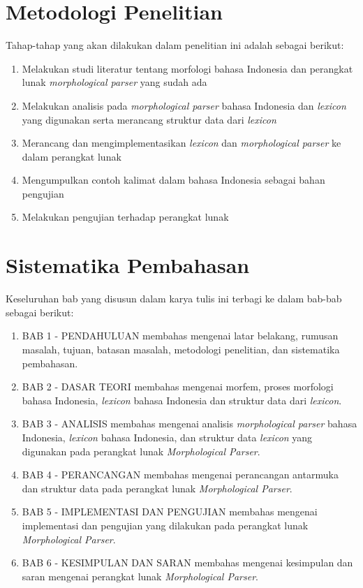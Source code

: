 \section{Metodologi Penelitian}
\label{sec:metodologiPenelitian}

Tahap-tahap yang akan dilakukan dalam penelitian ini adalah sebagai berikut:
\begin{enumerate}
	\item Melakukan studi literatur tentang morfologi bahasa Indonesia dan perangkat lunak {\it morphological parser} yang sudah ada
	\item Melakukan analisis pada {\it morphological parser} bahasa Indonesia dan {\it lexicon} yang digunakan serta merancang struktur data dari {\it lexicon}
	\item Merancang dan mengimplementasikan {\it lexicon} dan {\it morphological parser} ke dalam perangkat lunak
	\item Mengumpulkan contoh kalimat dalam bahasa Indonesia sebagai bahan pengujian
	\item Melakukan pengujian terhadap perangkat lunak
\end{enumerate}

\section{Sistematika Pembahasan}
\label{sec:sistematikaPembahasan}

Keseluruhan bab yang disusun dalam karya tulis ini terbagi ke dalam bab-bab sebagai berikut:

\begin{enumerate}
	\item BAB 1 - PENDAHULUAN membahas mengenai latar belakang, rumusan masalah, tujuan, batasan masalah, metodologi penelitian, dan sistematika pembahasan.
	\item BAB 2 - DASAR TEORI membahas mengenai morfem, proses morfologi bahasa Indonesia, {\it lexicon} bahasa Indonesia dan struktur data dari {\it lexicon}.
	\item BAB 3 - ANALISIS membahas mengenai analisis \textit{morphological parser} bahasa Indonesia, {\it lexicon} bahasa Indonesia, dan struktur data {\it lexicon} yang digunakan pada perangkat lunak {\it Morphological Parser}.
	\item BAB 4 - PERANCANGAN membahas mengenai perancangan antarmuka dan struktur data pada perangkat lunak {\it Morphological Parser}.
	\item BAB 5 - IMPLEMENTASI DAN PENGUJIAN membahas mengenai implementasi dan pengujian yang dilakukan pada perangkat lunak {\it Morphological Parser}.
	\item BAB 6 - KESIMPULAN DAN SARAN membahas mengenai kesimpulan dan saran mengenai perangkat lunak {\it Morphological Parser}.
\end{enumerate}